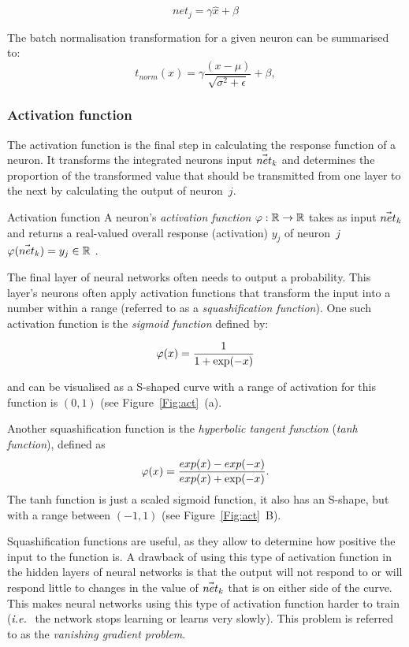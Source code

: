 \begin{equation}
net_j = \gamma \hat{x} + \beta
\end{equation}


The batch normalisation transformation for a given neuron can be summarised to:
\begin{equation}
    t_{norm}(x) = \gamma \frac{(x-\mu)}{\sqrt{\sigma^2 +\epsilon}} + \beta ,
\end{equation}

\subsubsection{Activation function}
\label{section:act}
The activation function is the final step in calculating the response function of a neuron. It transforms the integrated neurons input $\vec{net}_{k}$ and determines the proportion of the transformed value that should be transmitted from one layer to the next by calculating the output of neuron~$j$. 
\begin{Definition}{Activation function}{}
A neuron's \emph{activation function} $\varphi:\mathbb{R} \to \mathbb{R}$ takes as input $\vec{net}_{k}$ and returns a real-valued overall response (activation) $y_j$ of neuron~$j$ $\varphi(\vec{net}_{k})=y_j\in \mathbb{R}$ .
\end{Definition}

The final layer of neural networks often needs to output a probability. This layer's neurons often apply activation functions that transform the input into a number within a range (referred to as a \textit{squashification function}). One such activation function is the \textit{sigmoid function} defined by:

\begin{equation}
\label{eq:sigmoid}
\varphi(x)=\frac{1}{1+\exp (-x)}
\end{equation}

and can be visualised as a S-shaped curve with a range of activation for this function is $(0,1)$ (see Figure~\ref{Fig:act}~(a).

Another squashification function is the \textit{hyperbolic tangent function} (\textit{tanh function}), defined as
\begin{equation*}
\varphi(x)=\frac{exp(x) - exp (-x)}{exp (x)+\exp (-x)}.
\end{equation*}
The tanh function is just a scaled sigmoid function, it also has an S-shape, but with a range between $(-1, 1)$ (see Figure~\ref{Fig:act}~B). 

Squashification functions are useful, as they allow to determine how positive the input to the function is. A drawback of using this type of activation function in the hidden layers of neural networks is that the output will not respond to or will respond little to changes in the value of $\vec{net}_{k}$ that is on either side of the curve. This makes neural networks using this type of activation function harder to train ($\textit{i.e.}\ $ the network stops learning or learns very slowly). This problem is referred to as the \textit{vanishing gradient problem}.

